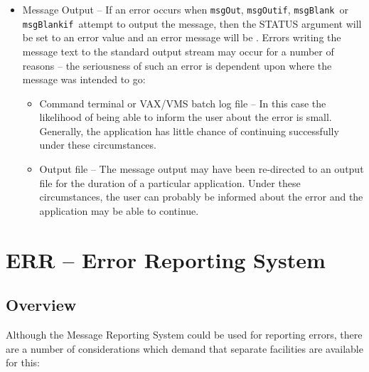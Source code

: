\documentclass[twoside,11pt]{starlink}
\providecommand{\func}[1]{\texttt{#1}}
\providecommand{\msgblank}{\func{msgBlank}}
\providecommand{\msgblankif}{\func{msgBlankif}}
\providecommand{\msgout}{\func{msgOut}}
\providecommand{\msgoutif}{\func{msgOutif}}
\begin{document}
\begin {itemize}
\item Message Output -- If an error occurs when
\msgout, \msgoutif, \msgblank\ or \msgblankif\ attempt to output the message, then the
STATUS argument will be set to an error value and an  error message will be
.
Errors writing the message text to the standard output stream may occur for a
number of reasons -- the seriousness of such an error is dependent upon where
the message was intended to go:

\begin {itemize}
\item Command terminal or VAX/VMS batch log file --
In this case the likelihood of being able to inform the user about the error
is small.
Generally, the application has little chance of continuing successfully under
these circumstances.

\item Output file --
The message output may have been re-directed to an output file for the
duration of a particular application.
Under these circumstances, the user can probably be informed about the error
and the application may be able to continue.
\end {itemize}
\end {itemize}


\section{ERR -- Error Reporting System }

\subsection{Overview}

Although the Message Reporting System could be used for reporting errors, there
are a number of considerations which demand that separate facilities are
available for this:
\end{document}

